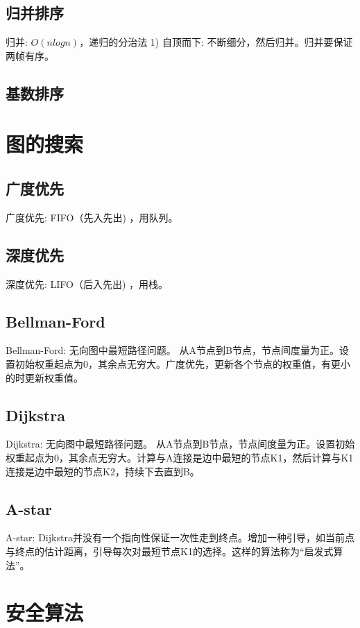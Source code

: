 \documentclass[UTF8]{../computerUniverse}
\begin{document}
\subsection{归并排序}

归并: $O(nlogn)$，递归的分治法
1) 自顶而下: 不断细分，然后归并。归并要保证两帧有序。


\subsection{基数排序}




\section{图的搜索}

\subsection{广度优先}
广度优先: FIFO（先入先出) ，用队列。


\subsection{深度优先}
深度优先: LIFO（后入先出) ，用栈。


\subsection{Bellman-Ford}
Bellman-Ford: 无向图中最短路径问题。
从A节点到B节点，节点间度量为正。设置初始权重起点为0，其余点无穷大。广度优先，更新各个节点的权重值，有更小的时更新权重值。


\subsection{Dijkstra}
Dijkstra: 无向图中最短路径问题。
从A节点到B节点，节点间度量为正。设置初始权重起点为0，其余点无穷大。计算与A连接是边中最短的节点K1，然后计算与K1连接是边中最短的节点K2，持续下去直到B。


\subsection{A-star}
A-star: Dijkstra并没有一个指向性保证一次性走到终点。增加一种引导，如当前点与终点的估计距离，引导每次对最短节点K1的选择。这样的算法称为“启发式算法”。



\section{安全算法}
\end{document}
